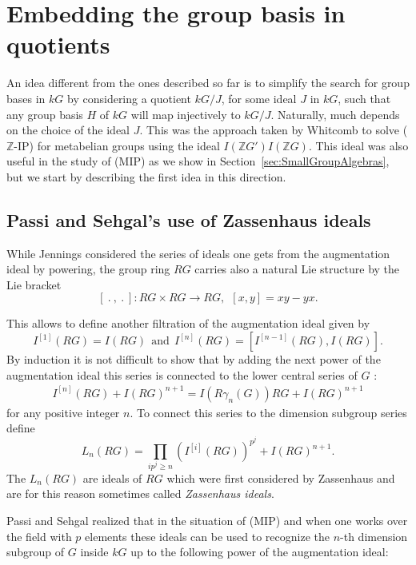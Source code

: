 \documentclass[11pt, a4paper]{amsart}
\theoremstyle{definition}
\begin{document}
\section{Embedding the group basis in quotients}\label{sec:quotients}

An idea different from the ones described so far is to simplify the search for group bases in $kG$ by considering a quotient $kG/J$, for some ideal $J$ in $kG$, such that any group basis $H$ of $kG$ will map injectively to $kG/J$. Naturally, much depends on the choice of the ideal $J$. This was the approach taken by Whitcomb to solve ($\mathbb{Z}$-IP) for metabelian groups using the ideal $I(\mathbb{Z}G')I(\mathbb{Z}G)$. This ideal was also useful in the study of (MIP) as we show in Section~\ref{sec:SmallGroupAlgebras}, but we start by describing the first idea in this direction.

\subsection{Passi and Sehgal's use of Zassenhaus ideals}\label{sec:LP}

While Jennings considered the series of ideals one gets from the augmentation ideal by powering, the group ring $RG$ carries also a natural Lie structure by the Lie bracket
\[  [\ . \ , \ . \ ]: RG \times RG \rightarrow RG, \ \ [x,y] = xy - yx. \]

This allows to define another filtration of the augmentation ideal given by 
\[I^{[1]}(RG) = I(RG) \ \  \text{and}  \ \ I^{[n]}(RG) = [I^{[n-1]}(RG), I(RG)].\]
By induction it is not difficult to show that by adding the next power of the augmentation ideal this series is connected to the lower central series of $G$ \cite[Lemma 6.8]{Sehgal78}:
\begin{align}\label{eq:Lien-th}
 I^{[n]}(RG) + I(RG)^{n+1} = I(R\gamma_n(G))RG + I(RG)^{n+1} 
\end{align}
for any positive integer $n$. To connect this series to the dimension subgroup series define
\[L_n(RG) = \prod_{ip^j \geq n} (I^{[i]}(RG))^{p^j} + I(RG)^{n+1}.  \]
The $L_n(RG)$ are ideals of $RG$ which were first considered by Zassenhaus \cite{Zassenhaus39} and are for this reason sometimes called \emph{Zassenhaus ideals}. 

Passi and Sehgal realized that in the situation of (MIP) and when one works over the field with $p$ elements these ideals can be used to recognize the $n$-th dimension subgroup of $G$ inside $kG$ up to the following power of the augmentation ideal:
\end{document}
